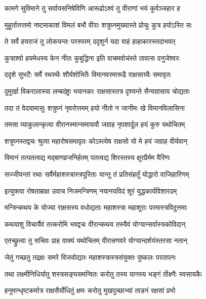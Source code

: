 \twolineshloka
{कामगे सुविमाने तु सर्वायसनिषेविणि}
{आरूढोऽश्वं तु वीराणां भयं कुर्वञ्जहार ह}%

\twolineshloka
{मुहूर्तात्तत्तमो नष्टमाकाशं विमलं बभौ}
{वीराः शत्रुघ्नमुख्यास्ते प्रोचुः कुत्र हयोऽस्ति सः}%

\twolineshloka
{ते सर्वे हयराजं तु लोकयन्तः परस्परम्}
{ददृशुर्न यदा वाहं हाहाकारस्तदाभवत्}%

\twolineshloka
{कुत्राश्वो हयमेधस्य केन नीतः कुबुद्धिना}
{इति वाचमवोचंस्ते तावत्स दनुजेश्वरः}%

\twolineshloka
{ददृशे सुभटैः सर्वै रथस्थैः शौर्यशोभितैः}
{विमानवरमारूढै राक्षसाग्र्यैः समावृतः}%

\twolineshloka
{दुमुर्खा विकरालास्या लम्बदंष्ट्रा भयानकाः}
{राक्षसास्तत्र दृश्यन्ते सैन्यग्रासाय चोद्यताः}%

\twolineshloka
{तदा तं वेदयामासुः शत्रुघ्नं नृवरोत्तमम्}
{हयो नीतो न जानीमः खे विमानविलासिना}%

\twolineshloka
{तमसा व्याकुलान्कृत्वा वीरानस्मान्समाययौ}
{जग्राह नृपशार्दूल हयं कुरु यथोचितम्}%

\twolineshloka
{शत्रुघ्नस्तद्वचः श्रुत्वा महारोषसमावृतः}
{कोऽस्त्येष राक्षसो यो मे हयं जग्राह वीर्यवान्}%

\twolineshloka
{विमानं तत्पतत्वद्य मद्बाणव्रजनिर्हतम्}
{पतत्वद्य शिरस्तस्य क्षुरप्रैर्मम वैरिणः}%

\twolineshloka
{सज्जीयन्तां रथाः सर्वैर्महाशस्त्रास्त्रपूरिताः}
{यान्तु तं प्रतिसंहर्तुं योद्धारो वाजिहारिणम्}%

\twolineshloka
{इत्युक्त्वा रोषताम्राक्ष उवाच निजमन्त्रिणम्}
{नयानयविदं शूरं युद्धकार्यविशारदम्}%


\twolineshloka
{मन्त्रिन्कथय के योज्या राक्षसस्य वधोद्यताः}
{महाशस्त्रा महाशूराः परमास्त्रविदुत्तमाः}%

\twolineshloka
{कथयाशु विचार्यैवं तत्करोमि भवद्वचः}
{वीरान्कथय तस्यैवं योग्यान्सर्वास्त्रकोविदान्}%

\twolineshloka
{एतच्छ्रुत्वा तु सचिवः प्राह वाक्यं यथोचितम्}
{वीरान्रणवरे योग्यान्दर्शयंस्तरसा नतान्}%


\twolineshloka
{जेतुं गच्छतु तद्रक्षः समरे विजयोद्यतः}
{महाशस्त्रास्त्रसंयुक्तः पुष्कलः परतापनः}%

\twolineshloka
{तथा लक्ष्मीनिधिर्यातु शस्त्रसङ्घसमन्वितः}
{करोतु तस्य यानस्य भङ्गं तीक्ष्णैः स्वसायकैः}%

\twolineshloka
{हनूमान्धृष्टकर्मात्र राक्षसैर्योधितुं क्षमः}
{करोतु मुखपुच्छाभ्यां ताडनं रक्षसां प्रभो}%

